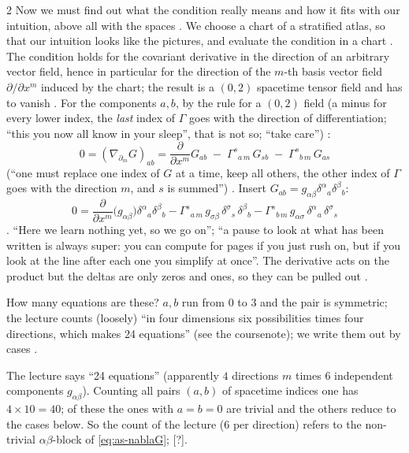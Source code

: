 \begin{paracol}{2}
Now we must find out what the condition really means and how it fits with our intuition, above all with the spaces . We choose a chart of a stratified atlas, so that our intuition looks like the pictures, and evaluate the condition in a chart
. The condition holds for the covariant derivative in the direction of an arbitrary vector field, hence in particular for the direction of the $m$-th basis vector field $\partial/\partial x^m$ induced by the chart; the result is a $(0,2)$ spacetime tensor field and has to vanish
. For the components $a,b$, by the rule for a $(0,2)$ field (a minus for every lower index, the \emph{last} index of $\Gamma$ goes with the direction of differentiation; ``this you now all know in your sleep'', that is not so; ``take care'') :
\begin{equation}\label{eq:as-nablaG}
  0=(\nabla_{\partial_m}G)_{ab}=\frac{\partial}{\partial x^m}G_{ab}\;-\;\Gamma^s{}_{a\,m}\,G_{sb}\;-\;\Gamma^s{}_{b\,m}\,G_{as}
\end{equation}
(``one must replace one index of $G$ at a time, keep all others, the other index of $\Gamma$ goes with the direction $m$, and $s$ is summed'') . Insert $G_{ab}=g_{\alpha\beta}\delta^\alpha{}_a\delta^\beta{}_b$:
\begin{equation}\label{eq:as-nablaG2}
  0=\frac{\partial}{\partial x^m}\bigl(g_{\alpha\beta}\bigr)\delta^\alpha{}_a\delta^\beta{}_b
  -\Gamma^s{}_{a\,m}\,g_{\sigma\beta}\,\delta^\sigma{}_s\,\delta^\beta{}_b
  -\Gamma^s{}_{b\,m}\,g_{\alpha\sigma}\,\delta^\alpha{}_a\,\delta^\sigma{}_s
\end{equation}
. ``Here we learn nothing yet, so we go on''; ``a pause to look at what has been written is always super: you can compute for pages if you just rush on, but if you look at the line after each one you simplify at once''. The derivative acts on the product but the deltas are only
zeros and ones, so they can be pulled out .

How many equations are these? $a,b$ run from $0$ to $3$ and the pair is symmetric; the lecture counts (loosely) ``in four dimensions six possibilities times four directions, which makes 24 equations'' (see the coursenote); we write them out by cases .

\begin{coursenote}
The lecture says ``24 equations'' (apparently $4$ directions $m$ times $6$ independent components $g_{\alpha\beta}$). Counting all pairs $(a,b)$ of spacetime indices one has $4\times10=40$; of these the ones with $a=b=0$ are trivial and the others reduce to the
cases below. So the count of the lecture (6 per direction) refers to the non-trivial $\alpha\beta$-block of \eqref{eq:as-nablaG}; [?].
\end{coursenote}


\end{paracol}
